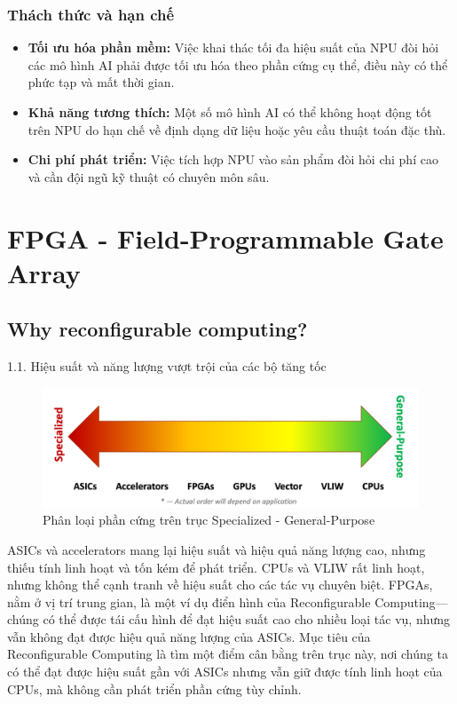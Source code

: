 \documentclass[a4paper]{article}
\begin{document}
\subsubsection{Thách thức và hạn chế}
\begin{itemize}
    \item \textbf{Tối ưu hóa phần mềm:} Việc khai thác tối đa hiệu suất của NPU đòi hỏi các mô hình AI phải được tối ưu hóa theo phần cứng cụ thể, điều này có thể phức tạp và mất thời gian.
    
    \item \textbf{Khả năng tương thích:} Một số mô hình AI có thể không hoạt động tốt trên NPU do hạn chế về định dạng dữ liệu hoặc yêu cầu thuật toán đặc thù.
    
    \item \textbf{Chi phí phát triển:} Việc tích hợp NPU vào sản phẩm đòi hỏi chi phí cao và cần đội ngũ kỹ thuật có chuyên môn sâu.
\end{itemize}

\section{FPGA - Field-Programmable Gate Array}
\subsection{Why reconfigurable computing?}
1.1. Hiệu suất và năng lượng vượt trội của các bộ tăng tốc
\begin{figure}[H]
    \centering
    \includegraphics[width=1\linewidth]{assets/phanloai.png}
    \caption{Phân loại phần cứng trên trục Specialized - General-Purpose}
    \label{fig:enter-label}
\end{figure}
ASICs và accelerators mang lại hiệu suất và hiệu quả năng lượng cao, nhưng thiếu tính linh hoạt và tốn kém để phát triển. CPUs và VLIW rất linh hoạt, nhưng không thể cạnh tranh về hiệu suất cho các tác vụ chuyên biệt. FPGAs, nằm ở vị trí trung gian, là một ví dụ điển hình của Reconfigurable Computing—chúng có thể được tái cấu hình để đạt hiệu suất cao cho nhiều loại tác vụ, nhưng vẫn không đạt được hiệu quả năng lượng của ASICs. Mục tiêu của Reconfigurable Computing là tìm một điểm cân bằng trên trục này, nơi chúng ta có thể đạt được hiệu suất gần với ASICs nhưng vẫn giữ được tính linh hoạt của CPUs, mà không cần phát triển phần cứng tùy chỉnh.
\end{document}
